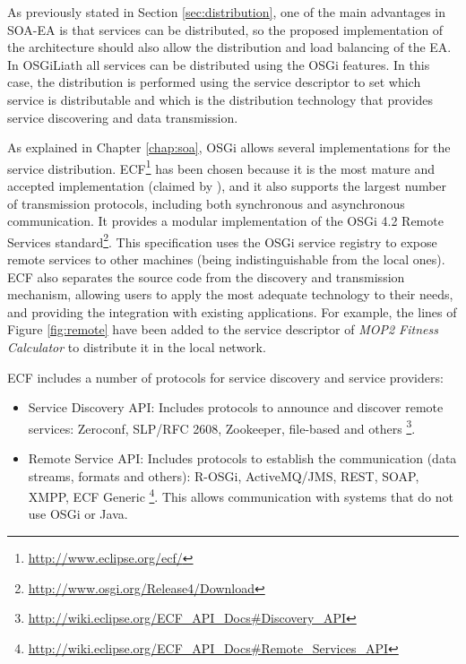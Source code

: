 As previously stated in Section \ref{sec:distribution}, one of the main advantages in SOA-EA is that services can be distributed, so the proposed implementation of the architecture  should also allow  the distribution and load balancing of the EA. In OSGiLiath all services can be distributed using the OSGi features. In this case, the distribution is performed using the service descriptor to set which service is distributable and which is the distribution technology that provides service discovering and data transmission.

As explained in Chapter \ref{chap:soa}, OSGi allows several implementations for the service distribution. ECF\footnote{\url{http://www.eclipse.org/ecf/}} has been chosen because it is the most mature and accepted implementation (claimed by  \cite{petzold2011dynamic}), and it also supports the largest number of transmission protocols, including both synchronous and asynchronous communication. It provides a modular implementation of the OSGi 4.2 Remote Services standard\footnote{\url{http://www.osgi.org/Release4/Download}}. This specification uses the OSGi service registry to expose remote services to other machines (being indistinguishable from the local ones).  ECF also separates the source code from the discovery and transmission mechanism, allowing users to apply the most adequate technology to their needs, and providing the integration with existing applications. For example, the lines of Figure \ref{fig:remote} have been added to the service descriptor of {\em MOP2 Fitness Calculator} to distribute it in the local network.

 

ECF includes a number of protocols for service discovery and service providers:
\begin{itemize}
\item Service Discovery API: Includes protocols to announce and discover remote services: Zeroconf, SLP/RFC 2608, Zookeeper, file-based and others \footnote{\url{http://wiki.eclipse.org/ECF_API_Docs\#Discovery_API}}.
\item Remote Service API: Includes protocols to establish the communication (data streams, formats and others): R-OSGi, ActiveMQ/JMS, REST, SOAP, XMPP, ECF Generic \footnote{\url{http://wiki.eclipse.org/ECF_API_Docs\#Remote_Services_API}}. This allows communication with systems that do not use OSGi or Java.
\end{itemize}



